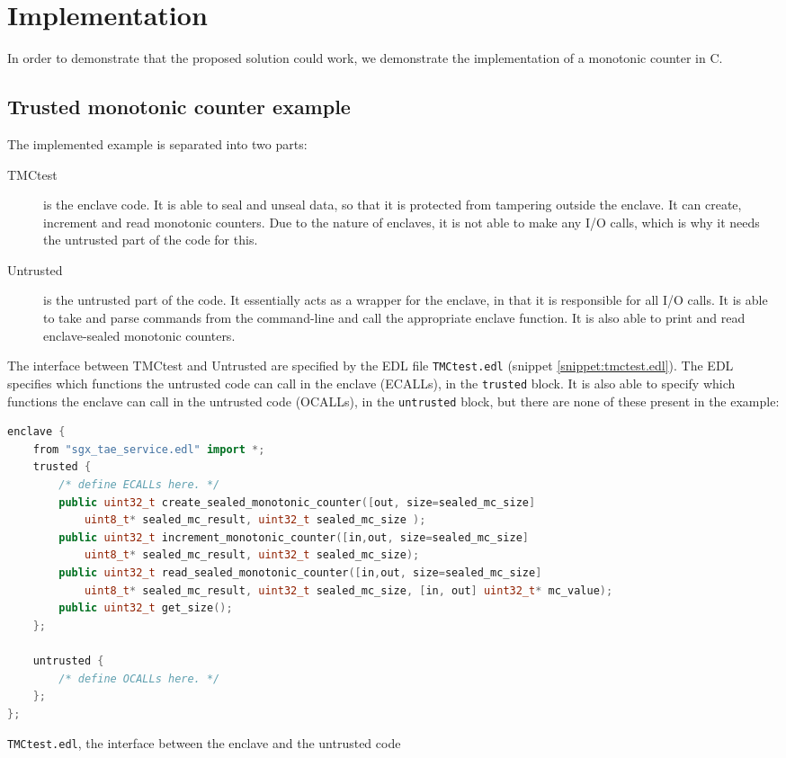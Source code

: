 \documentclass[12pt]{article}
\newcommand\cpp{C\nolinebreak[4]\hspace{-.05em}\raisebox{.4ex}{\relsize{-3}{\textbf{++}}}}
\begin{document}
	\section{Implementation}
	In order to demonstrate that the proposed solution could work, we demonstrate the implementation of a monotonic counter in \cpp.

	\subsection{Trusted monotonic counter example}
	The implemented example is separated into two parts:
	\begin{description}
		\item [TMCtest] is the enclave code. It is able to seal and unseal data, so that it is protected from tampering outside the enclave. It can create, increment and read monotonic counters. Due to the nature of enclaves, it is not able to make any I/O calls, which is why it needs the untrusted part of the code for this.
		\item [Untrusted] is the untrusted part of the code. It essentially acts as a wrapper for the enclave, in that it is responsible for all I/O calls. It is able to take and parse commands from the command-line and call the appropriate enclave function. It is also able to print and read enclave-sealed monotonic counters.  
	\end{description}
	The interface between TMCtest and Untrusted are specified by the EDL file \texttt{TMCtest.edl} (snippet \ref{snippet:tmctest.edl}). The EDL specifies which functions the untrusted code can call in the enclave (ECALLs), in the \texttt{trusted} block. 
	It is also able to specify which functions the enclave can call in the untrusted code (OCALLs), in the \texttt{untrusted} block, but there are none of these present in the example:
	\begin{snippet}[!ht]
	\begin{lstlisting}[language=C++, numbers=none]
enclave {
	from "sgx_tae_service.edl" import *;
    trusted {
        /* define ECALLs here. */
        public uint32_t create_sealed_monotonic_counter([out, size=sealed_mc_size]
            uint8_t* sealed_mc_result, uint32_t sealed_mc_size );
		public uint32_t increment_monotonic_counter([in,out, size=sealed_mc_size]
            uint8_t* sealed_mc_result, uint32_t sealed_mc_size);
		public uint32_t read_sealed_monotonic_counter([in,out, size=sealed_mc_size]
            uint8_t* sealed_mc_result, uint32_t sealed_mc_size, [in, out] uint32_t* mc_value);
		public uint32_t get_size();
    };

    untrusted {
        /* define OCALLs here. */
    };
};
	\end{lstlisting}
	\caption{\texttt{TMCtest.edl}, the interface between the enclave and the untrusted code\label{snippet:tmctest.edl}}
	\end{snippet}
\end{document}
